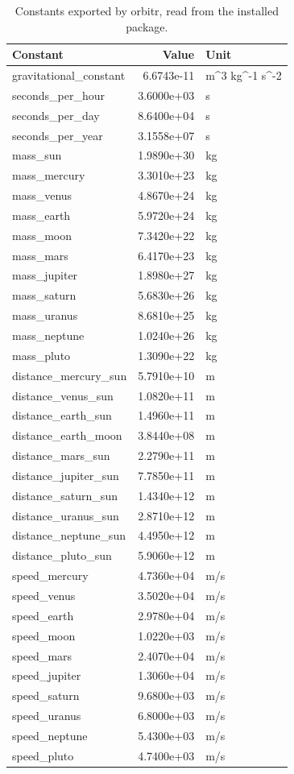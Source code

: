 \documentclass[
  10.5pt,
  letterpaper,
]{scrbook}
\theoremstyle{plain}
\theoremstyle{remark}
\begin{document}
{

\begin{longtable}[]{@{}lrl@{}}

\caption{\label{tbl-constants}Constants exported by orbitr, read from
the installed package.}

\tabularnewline

\toprule\noalign{}
Constant & Value & Unit \\
\midrule\noalign{}
\endhead
\bottomrule\noalign{}
\endlastfoot
gravitational\_constant & 6.6743e-11 & m\^{}3 kg\^{}-1 s\^{}-2 \\
seconds\_per\_hour & 3.6000e+03 & s \\
seconds\_per\_day & 8.6400e+04 & s \\
seconds\_per\_year & 3.1558e+07 & s \\
mass\_sun & 1.9890e+30 & kg \\
mass\_mercury & 3.3010e+23 & kg \\
mass\_venus & 4.8670e+24 & kg \\
mass\_earth & 5.9720e+24 & kg \\
mass\_moon & 7.3420e+22 & kg \\
mass\_mars & 6.4170e+23 & kg \\
mass\_jupiter & 1.8980e+27 & kg \\
mass\_saturn & 5.6830e+26 & kg \\
mass\_uranus & 8.6810e+25 & kg \\
mass\_neptune & 1.0240e+26 & kg \\
mass\_pluto & 1.3090e+22 & kg \\
distance\_mercury\_sun & 5.7910e+10 & m \\
distance\_venus\_sun & 1.0820e+11 & m \\
distance\_earth\_sun & 1.4960e+11 & m \\
distance\_earth\_moon & 3.8440e+08 & m \\
distance\_mars\_sun & 2.2790e+11 & m \\
distance\_jupiter\_sun & 7.7850e+11 & m \\
distance\_saturn\_sun & 1.4340e+12 & m \\
distance\_uranus\_sun & 2.8710e+12 & m \\
distance\_neptune\_sun & 4.4950e+12 & m \\
distance\_pluto\_sun & 5.9060e+12 & m \\
speed\_mercury & 4.7360e+04 & m/s \\
speed\_venus & 3.5020e+04 & m/s \\
speed\_earth & 2.9780e+04 & m/s \\
speed\_moon & 1.0220e+03 & m/s \\
speed\_mars & 2.4070e+04 & m/s \\
speed\_jupiter & 1.3060e+04 & m/s \\
speed\_saturn & 9.6800e+03 & m/s \\
speed\_uranus & 6.8000e+03 & m/s \\
speed\_neptune & 5.4300e+03 & m/s \\
speed\_pluto & 4.7400e+03 & m/s \\

\end{longtable}

}
\end{document}
